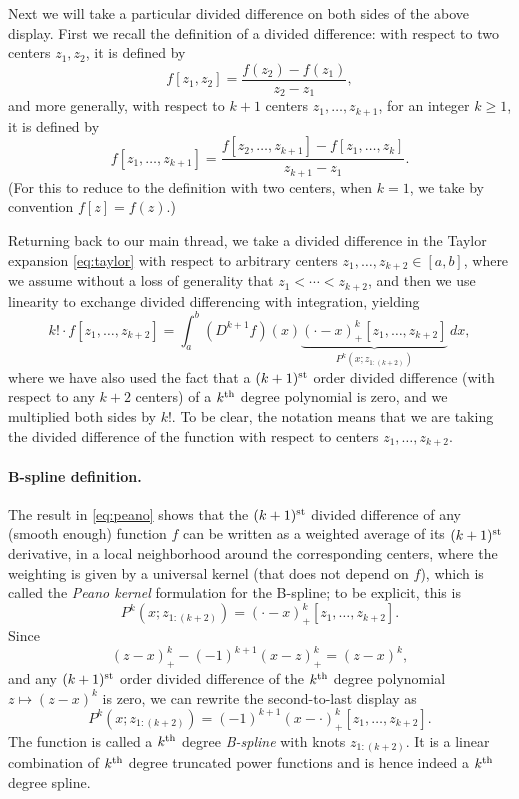 \documentclass{article}
\begin{document}
Next we will take a particular divided difference on both sides of the above
display. First we recall the definition of a divided difference: with respect to
two centers $z_1,z_2$, it is defined by       
\[
f[z_1,z_2] =  \frac{f(z_2)-f(z_1)}{z_2-z_1},
\]
and more generally, with respect to $k+1$ centers $z_1,\dots,z_{k+1}$, for an
integer $k \geq 1$, it is defined by  
\[
f[z_1,\dots,z_{k+1}] = \frac{f[z_2,\dots,z_{k+1}] -
f[z_1,\dots,z_k]}{z_{k+1}-z_1}.
\]
(For this to reduce to the definition with two centers, when $k=1$, we take by 
convention $f[z]=f(z)$.)   

Returning back to our main thread, we take a divided difference in the Taylor
expansion \eqref{eq:taylor} with respect to arbitrary centers $z_1,\dots,z_{k+2}
\in [a,b]$, where we assume without a loss of generality that $z_1 < \cdots <
z_{k+2}$, and then we use linearity to exchange divided differencing with
integration, yielding   
\begin{equation}
\label{eq:peano}
k! \cdot f[z_1,\dots,z_{k+2}] = \int_a^b (D^{k+1} f)(x)
\underbrace{(\cdot-x)^k_+[z_1,\dots,z_{k+2}]}_{P^k(x; z_{1:(k+2)})} \, dx, 
\end{equation}
where we have also used the fact that a $(k+1)^{\text{st}}$ order divided difference (with
respect to any $k+2$ centers) of a $k^{\text{th}}$ degree polynomial is zero, and we
multiplied both sides by $k!$. To be clear, the notation  means that we are taking the divided difference of
the function  with respect to centers
$z_1,\dots,z_{k+2}$.    

\paragraph{B-spline definition.}  

The result in \eqref{eq:peano} shows that the $(k+1)^{\text{st}}$ divided difference 
of any (smooth enough) function $f$ can be written as a weighted average of 
its $(k+1)^{\text{st}}$ derivative, in a local neighborhood around the corresponding
centers, where the weighting is given by a universal kernel  (that does not depend on $f$), which is called the \emph{Peano 
  kernel} formulation for the B-spline; to be explicit, this is
\[
P^k(x; z_{1:(k+2)}) = (\cdot - x)^k_+[z_1,\dots,z_{k+2}].
\]
Since 
\[
(z-x)^k_+ - (-1)^{k+1} (x-z)^k_+ =  (z-x)^k,
\]
and any $(k+1)^{\text{st}}$ order divided difference of the $k^{\text{th}}$ degree polynomial $z
\mapsto (z-x)^k$ is zero, we can rewrite the second-to-last display as
\[
P^k(x; z_{1:(k+2)}) = (-1)^{k+1} (x - \cdot)^k_+[z_1,\dots,z_{k+2}].
\]
The function  is called a $k^{\text{th}}$ degree
\emph{B-spline} with knots $z_{1:(k+2)}$. It is a linear combination of $k^{\text{th}}$ 
degree truncated power functions and is hence indeed a $k^{\text{th}}$ degree spline.  
\end{document}
